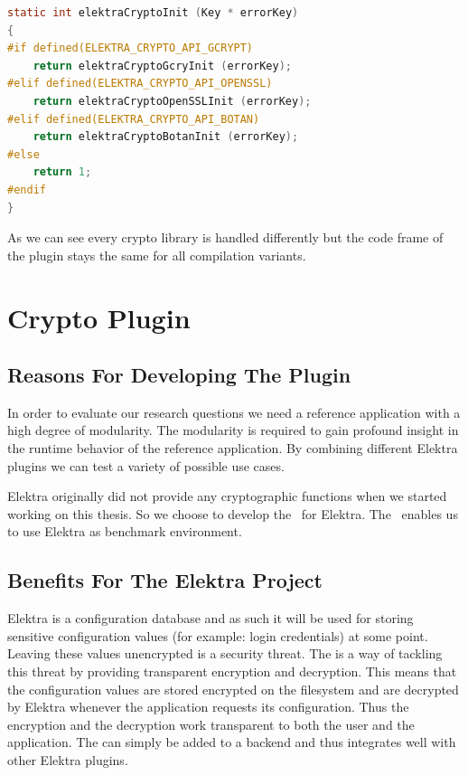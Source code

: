 \begin{lstlisting}[label=impl-cryptoInit,language=C,caption={Example of how to use compilation variants in Elektra}]
static int elektraCryptoInit (Key * errorKey)
{
#if defined(ELEKTRA_CRYPTO_API_GCRYPT)
	return elektraCryptoGcryInit (errorKey);
#elif defined(ELEKTRA_CRYPTO_API_OPENSSL)
	return elektraCryptoOpenSSLInit (errorKey);
#elif defined(ELEKTRA_CRYPTO_API_BOTAN)
	return elektraCryptoBotanInit (errorKey);
#else
	return 1;
#endif
}
\end{lstlisting}

As we can see every crypto library is handled differently but the code frame of the plugin stays the same for all compilation variants.

\section{Crypto Plugin}\label{crypto-plugin}

\subsection{Reasons For Developing The Plugin}

In order to evaluate our research questions we need a reference application with a high degree of modularity.
The modularity is required to gain profound insight in the runtime behavior of the reference application.
By combining different Elektra plugins we can test a variety of possible use cases.

Elektra originally did not provide any cryptographic functions when we started working on this thesis.
So we choose to develop the \crypto ~for Elektra.
The \crypto ~enables us to use Elektra as benchmark environment.

\subsection{Benefits For The Elektra Project}

Elektra is a configuration database and as such it will be used for storing sensitive configuration values (for example: login credentials) at some point.
Leaving these values unencrypted is a security threat.
The \crypto{} is a way of tackling this threat by providing transparent encryption and decryption.
This means that the configuration values are stored encrypted on the filesystem and are decrypted by Elektra whenever the application requests its configuration.
Thus the encryption and the decryption work transparent to both the user and the application.
The \crypto{} can simply be added to a backend and thus integrates well with other Elektra plugins.

